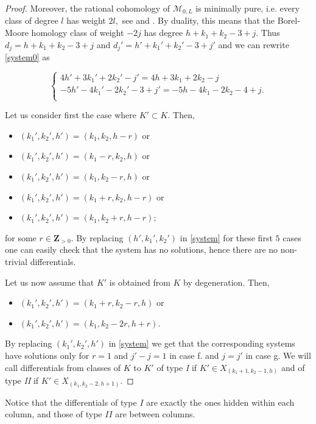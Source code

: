 \documentclass[10pt,a4paper,twoside]{amsart}
\theoremstyle{plain}
\theoremstyle{definition}
\theoremstyle{remark}
\begin{document}
\begin{proof}
Moreover, the rational cohomology of $\mathcal{M}_{0,L}$ is minimally pure, i.e. every class of degree $l$ has weight $2l,$ see \cite[Definitions 3.1 and 5.1]{DL} and \cite[Lemma 2.5]{KL}. By duality, this means that the Borel-Moore homology class of weight $-2j$ has degree $h+k_1+k_2-3+j$. Thus $d_j=h+k_1+k_2-3+j$ and $d_j'=h'+k_1'+k_2'-3+j'$ and we can rewrite \eqref{system0} as

\begin{equation}\label{system}
\begin{cases}
4h'+3k_1'+2k_2'-j'=4h+3k_1+2k_2-j\\
-5h'-4k_1'-2k_2'-3+j'=-5h-4k_1-2k_2-4+j.\\
\end{cases}
\end{equation}


Let us consider first the case where $K'\subset K$. Then, 
\begin{itemize}
\item[a.] $(k_1',k_2',h')=(k_1,k_2,h-r)$ or
\item[b.] $(k_1',k_2',h')=(k_1-r,k_2,h)$ or
\item[c.] $(k_1',k_2',h')=(k_1,k_2-r,h)$ or 
\item[d.] $(k_1',k_2',h')=(k_1+r,k_2,h-r)$ or 
\item[e.] $(k_1',k_2',h')=(k_1,k_2+r,h-r);$
\end{itemize}
for some $r\in\mathbf{Z}_{>0}.$
By replacing $(h',k_1',k_2')$ in \eqref{system} for these first $5$ cases one can easily check that the system has no solutions, hence there are no non-trivial differentials.

Let us now assume that $K'$ is obtained from $K$ by degeneration. Then, 
\begin{itemize}
\item[f.] $(k_1',k_2',h')=(k_1+r,k_2-r,h)$ or
\item[g.] $(k_1',k_2',h')=(k_1,k_2-2r,h+r)$. 
\end{itemize}

By replacing $(k_1',k_2',h')$ in \eqref{system} we get that the corresponding systems have solutions only for $r=1$ and 
$j'-j=1$ in case f. and
$j=j'$ in case g.
We will call differentials from classes of $K$ to $K'$ of type \emph{I} if $K'\in X_{(k_1+1,k_2-1,h)}$ and of type \emph{II} if $K'\in X_{(k_1,k_2-2,h+1)}$.
\end{proof}


Notice that the differentials of type $I$ are exactly the ones hidden within each column, and those of type $II$ are between columns.
\end{document}
